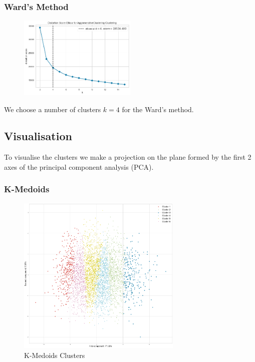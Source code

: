 \documentclass[12pt,a4paper,openany,UKenglish]{scrreprt}
\begin{document}
\subsubsection{Ward's Method}
\begin{figure}[H]
	\centering
	\includegraphics[width=0.5\textwidth]{../Images/MHierElbow.png}
\end{figure}
We choose a number of clusters $k=4$ for the Ward's method.

\subsection{Visualisation}
To visualise the clusters we make a projection on the plane formed by the first 2 axes of the principal component analysis (PCA).
\subsubsection{K-Medoids}
\begin{figure}[H]
	\centering
	\caption{K-Medoids Clusters}
	\includegraphics[width=0.7\textwidth]{../Images/MMedoidsProjection.png}
\end{figure}
\end{document}

